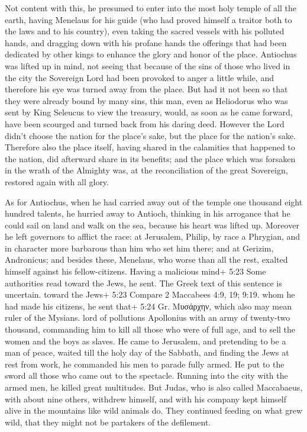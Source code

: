  Not content with this, he presumed to enter into the most
holy temple of all the earth, having Menelaus for his guide (who had
proved himself a traitor both to the laws and to his country),
 even taking the sacred vessels with his polluted hands,
and dragging down with his profane hands the offerings that had been
dedicated by other kings to enhance the glory and honor of the place.
 Antiochus was lifted up in mind, not seeing that because
of the sins of those who lived in the city the Sovereign Lord had been
provoked to anger a little while, and therefore his eye was turned away
from the place.  But had it not been so that they were
already bound by many sins, this man, even as Heliodorus who was sent by
King Seleucus to view the treasury, would, as soon as he came forward,
have been scourged and turned back from his daring deed. 
However the Lord didn't choose the nation for the place's sake, but the
place for the nation's sake.  Therefore also the place
itself, having shared in the calamities that happened to the nation, did
afterward share in its benefits; and the place which was forsaken in the
wrath of the Almighty was, at the reconciliation of the great Sovereign,
restored again with all glory.

 As for Antiochus, when he had carried away out of the
temple one thousand eight hundred talents, he hurried away to Antioch,
thinking in his arrogance that he could sail on land and walk on the
sea, because his heart was lifted up.  Moreover he left
governors to afflict the race: at Jerusalem, Philip, by race a Phrygian,
and in character more barbarous than him who set him there;
 and at Gerizim, Andronicus; and besides these, Menelaus,
who worse than all the rest, exalted himself against his
fellow-citizens. Having a malicious mind+ 5:23 Some authorities read
toward the Jews, he sent. The Greek text of this sentence is uncertain.
toward the Jews+ 5:23 Compare 2 Maccabees 4:9, 19; 9:19. whom he had
made his citizens,  he sent that+ 5:24 Gr. Μυσάρχην, which
also may mean ruler of the Mysians. lord of pollutions Apollonius with
an army of twenty-two thousand, commanding him to kill all those who
were of full age, and to sell the women and the boys as slaves.
 He came to Jerusalem, and pretending to be a man of peace,
waited till the holy day of the Sabbath, and finding the Jews at rest
from work, he commanded his men to parade fully armed.  He
put to the sword all those who came out to the spectacle. Running into
the city with the armed men, he killed great multitudes. 
But Judas, who is also called Maccabaeus, with about nine others,
withdrew himself, and with his company kept himself alive in the
mountains like wild animals do. They continued feeding on what grew
wild, that they might not be partakers of the defilement.

